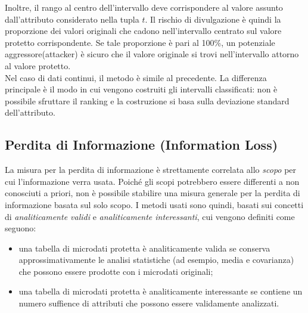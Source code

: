 Inoltre, il rango al centro dell'intervallo deve corrispondere al valore assunto dall'attributo considerato nella tupla $t$. Il rischio di divulgazione è quindi la proporzione dei valori originali che cadono nell'intervallo centrato sul valore protetto corrispondente. Se tale proporzione è pari al 100\%, un potenziale aggressore(attacker) è sicuro che il valore originale si trovi nell'intervallo attorno al valore protetto.\\
Nel caso di dati continui, il metodo è simile al precedente. La differenza principale è il modo in cui vengono costruiti gli intervalli classificati: non è possibile sfruttare il ranking e la costruzione si basa sulla deviazione standard dell'attributo.

\subsection{Perdita di Informazione (Information Loss)}
La misura per la perdita di informazione è strettamente correlata allo \textit{scopo} per cui l'informazione verra usata. Poiché gli scopi potrebbero essere differenti a non conosciuti a priori, non è possibile stabilire una misura generale per la perdita di informazione basata sul solo scopo. I metodi usati sono quindi, basati sui concetti di \textit{analiticamente validi} e \textit{analiticamente interessanti}, cui vengono definiti come seguono:
\begin{itemize}
    \item una tabella di microdati protetta è analiticamente valida se conserva approssimativamente le analisi statistiche (ad esempio, media e covarianza) che possono essere prodotte con i microdati originali;
    \item una tabella di microdati protetta è analiticamente interessante se contiene un numero suffience di attributi che possono essere validamente analizzati.
\end{itemize}

